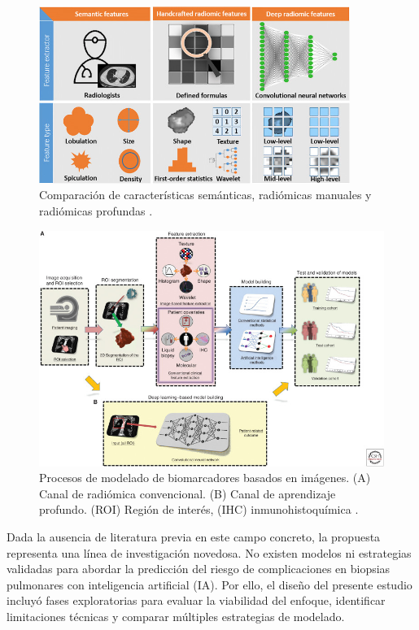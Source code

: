 \begin{figure}[!htbp]
    \centering
    \includegraphics[width=0.9\textwidth]{img/comp_radiomica.jpg}
    \caption{Comparación de características semánticas, radiómicas manuales y radiómicas profundas \parencite{wu2021structural}.}
    \label{fig:compcaracteristicas_radiomica-label}
\end{figure}

\begin{figure}[!htbp]
    \centering
    \includegraphics[width=1\textwidth]{img/radiomica2.jpg}
    \caption{Procesos de modelado de biomarcadores basados en imágenes. (A) Canal de radiómica convencional. (B) Canal de aprendizaje profundo. (ROI) Región de interés, (IHC) inmunohistoquímica \parencite{leiter2023global}.}
    \label{fig:radiomica2-label}
\end{figure}


Dada la ausencia de literatura previa en este campo concreto, la propuesta representa una línea de investigación novedosa. No existen modelos ni estrategias validadas para abordar la predicción del riesgo de complicaciones en biopsias pulmonares con inteligencia artificial (IA). Por ello, el diseño del presente estudio incluyó fases exploratorias para evaluar la viabilidad del enfoque, identificar limitaciones técnicas y comparar múltiples estrategias de modelado.

